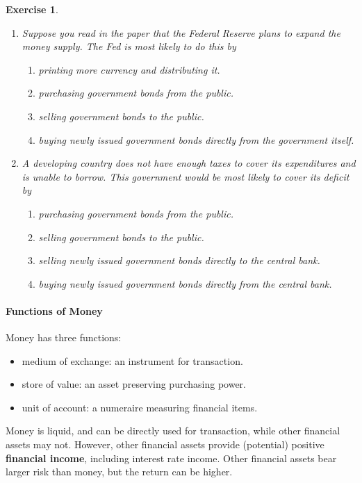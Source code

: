 \documentclass[12pt]{article}
\newtheorem{exercise}{Exercise}
\begin{document}
\begin{exercise}
	\begin{enumerate}[label=(\arabic*)]
		\item Suppose you read in the paper that the Federal Reserve plans to expand the money supply. The Fed is most likely to do this by
		\begin{enumerate}[label=\Alph*]
			\item printing more currency and distributing it.
			\item purchasing government bonds from the public.
			\item selling government bonds to the public.
			\item buying newly issued government bonds directly from the government itself.
		\end{enumerate}
		\item A developing country does not have enough taxes to cover its expenditures and is unable to borrow. This government would be most likely to cover its deficit by
		\begin{enumerate}[label=\Alph*]
			\item purchasing government bonds from the public.
			\item selling government bonds to the public.
			\item selling newly issued government bonds directly to the central bank.
			\item buying newly issued government bonds directly from the central bank.
		\end{enumerate}
	\end{enumerate}
\end{exercise}

\paragraph{Functions of Money}
Money has three functions:
\begin{itemize}
	\item medium of exchange: an instrument for transaction.
	\item store of value: an asset preserving purchasing power.
	\item unit of account: a numeraire measuring financial items.
\end{itemize}

Money is liquid, and can be directly used for transaction, while other financial assets may not. However, other financial assets provide (potential) positive \textbf{financial income}, including interest rate income. Other financial assets bear larger risk than money, but the return can be higher.
\end{document}
